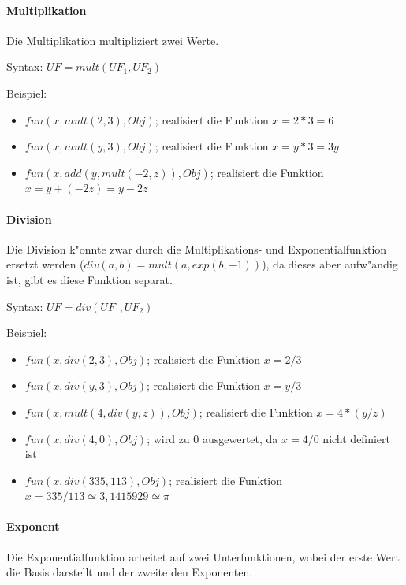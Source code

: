 \paragraph{Multiplikation}

Die Multiplikation multipliziert zwei Werte.

\bigskip\noindent
Syntax:
$UF=mult( UF_1, UF_2 )$

\bigskip\noindent
Beispiel:
\begin{itemize}
 \item $fun(x, mult( 2, 3), Obj)$; realisiert die Funktion $x=2*3=6$
 \item $fun(x, mult( y, 3), Obj)$; realisiert die Funktion $x=y*3=3y$
 \item $fun(x, add( y, mult( -2, z ) ), Obj)$; realisiert die Funktion $x=y+(-2z)=y-2z$
\end{itemize}

\paragraph{Division}

Die Division k"onnte zwar durch die Multiplikations- und Exponentialfunktion ersetzt werden ($div(a,b)=mult( a, exp(b,-1) )$), da dieses aber aufw"andig ist, gibt es diese Funktion separat.

\bigskip\noindent
Syntax:
$UF=div( UF_1, UF_2 )$

\bigskip\noindent
Beispiel:
\begin{itemize}
 \item $fun(x, div( 2, 3 ), Obj)$; realisiert die Funktion $x=2/3$
 \item $fun(x, div( y, 3 ), Obj)$; realisiert die Funktion $x=y/3$
 \item $fun(x, mult( 4, div( y, z ) ), Obj)$; realisiert die Funktion $x=4*(y/z)$
 \item $fun(x, div( 4, 0 ), Obj)$; wird zu $0$ ausgewertet, da $x=4/0$ nicht definiert ist
 \item $fun(x, div( 335, 113 ), Obj)$; realisiert die Funktion $x=335/113 \simeq 3{,}1415929 \simeq \pi$
\end{itemize}


\paragraph{Exponent}

Die Exponentialfunktion arbeitet auf zwei Unterfunktionen, wobei der erste Wert die Basis darstellt und der zweite den Exponenten.


